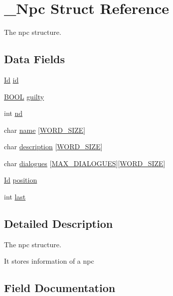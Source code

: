 \hypertarget{struct__Npc}{}\section{\+\_\+\+Npc Struct Reference}
\label{struct__Npc}


The npc structure.  


\subsection*{Data Fields}
\begin{DoxyCompactItemize}
\item 
\hyperlink{types_8h_a845e604fb28f7e3d97549da3448149d3}{Id} \hyperlink{struct__Npc_aff473e7ff7ee46f9fcd3bc47f369ce85}{id}
\item 
\hyperlink{types_8h_a3e5b8192e7d9ffaf3542f1210aec18dd}{B\+O\+OL} \hyperlink{struct__Npc_a1a0787e39c21214fbe4076784d31146b}{guilty}
\item 
int \hyperlink{struct__Npc_a6301db399673c2fd01e898893d7048f4}{nd}
\item 
char \hyperlink{struct__Npc_a0a5fbaf3e3f16874eb2e64c8a8f359de}{name} \mbox{[}\hyperlink{types_8h_a92ed8507d1cd2331ad09275c5c4c1c89}{W\+O\+R\+D\+\_\+\+S\+I\+ZE}\mbox{]}
\item 
char \hyperlink{struct__Npc_acb2bd409b0a8119b66ef2162b5f2bfc6}{description} \mbox{[}\hyperlink{types_8h_a92ed8507d1cd2331ad09275c5c4c1c89}{W\+O\+R\+D\+\_\+\+S\+I\+ZE}\mbox{]}
\item 
char \hyperlink{struct__Npc_ab50ed0ce16e8452ac34a78f5b20e0cd8}{dialogues} \mbox{[}\hyperlink{npc_8h_a0f3f5f7d4d9b807bb98112298f9562ca}{M\+A\+X\+\_\+\+D\+I\+A\+L\+O\+G\+U\+ES}\mbox{]}\mbox{[}\hyperlink{types_8h_a92ed8507d1cd2331ad09275c5c4c1c89}{W\+O\+R\+D\+\_\+\+S\+I\+ZE}\mbox{]}
\item 
\hyperlink{types_8h_a845e604fb28f7e3d97549da3448149d3}{Id} \hyperlink{struct__Npc_ad99151357fe871205b1531858fa13748}{position}
\item 
int \hyperlink{struct__Npc_ab004908c0334b1213d97ee2f58368639}{last}
\end{DoxyCompactItemize}


\subsection{Detailed Description}
The npc structure. 

It stores information of a npc 

\subsection{Field Documentation}
\mbox{\label{struct__Npc_acb2bd409b0a8119b66ef2162b5f2bfc6}} 
